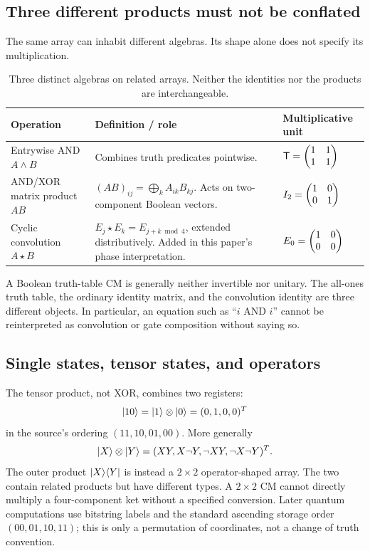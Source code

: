 \subsection{Three different products must not be conflated}
The same array can inhabit different algebras. Its shape alone does not specify its multiplication.
\begin{table}[htbp]
\centering\small
\begin{tabularx}{\textwidth}{@{}L{0.26\textwidth}Y L{0.21\textwidth}@{}}
\toprule
Operation & Definition / role & Multiplicative unit\\
\midrule
Entrywise AND $A\land B$ & Combines truth predicates pointwise. & $\mathsf T=\begin{pmatrix}1&1\\1&1\end{pmatrix}$\\
AND/XOR matrix product $AB$ & $(AB)_{ij}=\bigoplus_k A_{ik}B_{kj}$. Acts on two-component Boolean vectors. & $I_2=\begin{pmatrix}1&0\\0&1\end{pmatrix}$\\
Cyclic convolution $A\star B$ & $E_j\star E_k=E_{j+k\bmod4}$, extended distributively. Added in this paper's phase interpretation. & $E_0=\begin{pmatrix}1&0\\0&0\end{pmatrix}$\\
\bottomrule
\end{tabularx}
\caption{Three distinct algebras on related arrays. Neither the identities nor the products are interchangeable.}
\end{table}
A Boolean truth-table CM is generally neither invertible nor unitary. The all-ones truth table, the ordinary identity matrix, and the convolution identity are three different objects. In particular, an equation such as ``$i$ AND $i$'' cannot be reinterpreted as convolution or gate composition without saying so.

\subsection{Single states, tensor states, and operators}
The tensor product, not XOR, combines two registers:
\begin{equation}
 \lvert 10\rangle=\lvert 1\rangle\otimes\lvert 0\rangle=(0,1,0,0)^T
\end{equation}
in the source's ordering $(11,10,01,00)$. More generally
\begin{equation}
 \lvert X\rangle\otimes\lvert Y\rangle=(XY,X\neg Y,\neg XY,\neg X\neg Y)^T.
\end{equation}
The outer product $\lvert X\rangle\langle Y\rvert$ is instead a $2\times2$ operator-shaped array. The two contain related products but have different types. A $2\times2$ CM cannot directly multiply a four-component ket without a specified conversion. Later quantum computations use bitstring labels and the standard ascending storage order $(00,01,10,11)$; this is only a permutation of coordinates, not a change of truth convention.


